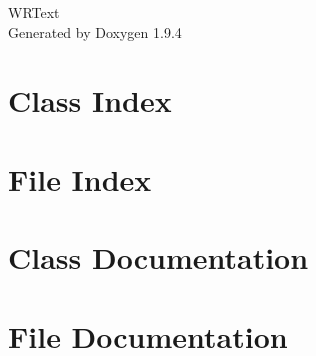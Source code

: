 \documentclass[twoside]{book}
\newcommand{\+}{\discretionary{\mbox{\scriptsize$\hookleftarrow$}}{}{}}
\newcommand{\clearemptydoublepage}{%
    \newpage{\pagestyle{empty}\cleardoublepage}%
  }
\begin{document}
  \raggedbottom
    \hypersetup{pageanchor=false,
                bookmarksnumbered=true,
                pdfencoding=unicode
               }
  \begin{titlepage}
  \vspace*{7cm}
  \begin{center}%
  {\Large WRText}\\
  \vspace*{1cm}
  {\large Generated by Doxygen 1.9.4}\\
  \end{center}
  \end{titlepage}
  \clearemptydoublepage
  \tableofcontents
  \clearemptydoublepage
  \hypersetup{pageanchor=true}
\chapter{Class Index}

\chapter{File Index}

\chapter{Class Documentation}




\chapter{File Documentation}




























  \backmatter
  \newpage
  \clearemptydoublepage
  \printindex
\end{document}
